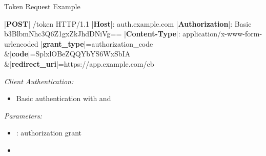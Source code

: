 \documentclass[aspectratio=169]{beamer}
\begin{document}
\begin{frame}[fragile]{Token Request Example}
\begin{textcode}
|\textbf{POST}| /token HTTP/1.1
|\textbf{Host}|: auth.example.com
|\textbf{Authorization}|: Basic b3BlbmNhc3Q6Z1gxZkJhdDNiVg==
|\textbf{Content-Type}|: application/x-www-form-urlencoded
  |\textbf{grant\_type}|=authorization_code
  &|\textbf{code}|=SplxlOBeZQQYbYS6WxSbIA
  &|\textbf{redirect\_uri}|=https://app.example.com/cb
\end{textcode}

\hfill {}
	
	\vspace*{-2mm}
	\emph{Client Authentication:}
	\begin{itemize}
		\item Basic authentication with  and 
	\end{itemize}
	\emph{Parameters:}
	\begin{itemize}
		\item {}: authorization grant \hfill {}
		\item {}
	\end{itemize}
	\vspace{-1mm}
\end{frame}
\end{document}
